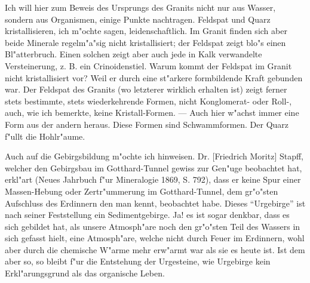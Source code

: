 \documentclass[a4paper, 11pt, oneside]{article}
\begin{document}
Ich will hier zum Beweis des Ursprungs des Granits nicht nur aus Wasser, sondern aus Organismen, einige Punkte nachtragen. Feldspat und Quarz kristallisieren, ich m"ochte sagen, leidenschaftlich. Im Granit finden sich aber beide Minerale regelm"a"sig nicht kristallisiert; der Feldspat zeigt blo"s einen Bl"atterbruch. Einen solchen zeigt aber auch jede in Kalk verwandelte Versteinerung, z. B. ein Crinoidenstiel. Warum kommt der Feldspat im Granit nicht kristallisiert vor? Weil er durch eine st"arkere formbildende Kraft gebunden war. Der Feldspat des Granits (wo letzterer wirklich erhalten ist) zeigt ferner stets bestimmte, stets wiederkehrende Formen, nicht Konglomerat- oder Roll-, auch, wie ich bemerkte, keine Kristall-Formen. --- Auch hier w"achst immer eine Form aus der andern heraus. Diese Formen sind Schwammformen. Der Quarz f"ullt die Hohlr"aume.

Auch auf die Gebirgsbildung m"ochte ich hinweisen. Dr. [Friedrich Moritz] Stapff, welcher den Gebirgsbau im Gotthard-Tunnel gewiss zur Gen"uge beobachtet hat, erkl"art (Neues Jahrbuch f"ur Mineralogie 1869, S. 792), dass er keine Spur einer Massen-Hebung oder Zertr"ummerung im Gotthard-Tunnel, dem gr"o"sten Aufschluss des Erdinnern den man kennt, beobachtet habe. Dieses "`Urgebirge"' ist nach seiner Feststellung ein Sedimentgebirge. Ja! es ist sogar denkbar, dass es sich gebildet hat, als unsere Atmosph"are noch den gr"o"sten Teil des Wassers in sich gefasst hielt, eine Atmosph"are, welche nicht durch Feuer im Erdinnern, wohl aber durch die chemische W"arme mehr erw"armt war als sie es heute ist. Ist dem aber so, so bleibt f"ur die Entstehung der Urgesteine, wie Urgebirge kein Erkl"arungsgrund als das organische Leben.
\end{document}

